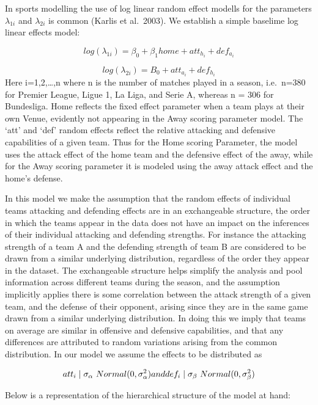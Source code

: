 \documentclass[
]{article}
\begin{document}
In sports modelling the use of log linear random effect modells for the
parameters \(\lambda_{1i}\) and \(\lambda_{2i}\) is common (Karlis et
al.~2003). We establish a simple baselime log linear effects model:

\[log(\lambda_{1i}) = \beta_0 + \beta_1 home + att_{h_i} + def_{a_i}  \]

\[log(\lambda_{2i}) =  B_0 + att_{a_i} + def_{h_i}\] Here i=1,2,\ldots,n
where n is the number of matches played in a season, i.e.~n=380 for
Premier League, Ligue 1, La Liga, and Serie A, whereas n = 306 for
Bundesliga. Home reflects the fixed effect parameter when a team plays
at their own Venue, evidently not appearing in the Away scoring
parameter model. The `att' and `def' random effects reflect the relative
attacking and defensive capabilities of a given team. Thus for the Home
scoring Parameter, the model uses the attack effect of the home team and
the defensive effect of the away, while for the Away scoring parameter
it is modeled using the away attack effect and the home's defense.

In this model we make the assumption that the random effects of
individual teams attacking and defending effects are in an exchangeable
structure, the order in which the teams appear in the data does not have
an impact on the inferences of their individual attacking and defending
strengths. For instance the attacking strength of a team A and the
defending strength of team B are considered to be drawn from a similar
underlying distribution, regardless of the order they appear in the
dataset. The exchangeable structure helps simplify the analysis and pool
information across different teams during the season, and the assumption
implicitly applies there is some correlation between the attack strength
of a given team, and the defense of their opponent, arising since they
are in the same game drawn from a similar underlying distribution. In
doing this we imply that teams on average are similar in offensive and
defensive capabilities, and that any differences are attributed to
random variations arising from the common distribution. In our model we
assume the effects to be distributed as

\[att_i \mid \sigma_\alpha ~ Normal(0, \sigma^2_\alpha) \\ and \\ def_i \mid \sigma_\beta ~ Normal(0, \sigma^2_\beta)\]

Below is a representation of the hierarchical structure of the model at
hand:
\end{document}
